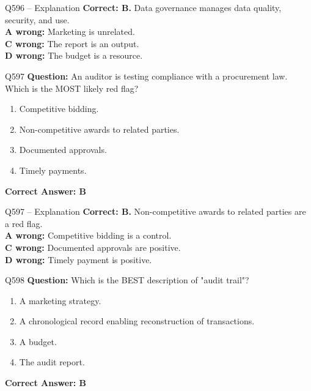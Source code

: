 \documentclass[aspectratio=169,10pt]{beamer}
\begin{document}
	\begin{frame}[t]{Q596 -- Explanation}
		\small
		\textbf{Correct: B.} Data governance manages data quality, security, and use. \\[4pt]
		\textbf{A wrong:} Marketing is unrelated. \\[2pt]
		\textbf{C wrong:} The report is an output. \\[2pt]
		\textbf{D wrong:} The budget is a resource.
	\end{frame}
	
	\begin{frame}[t]{Q597}
		\small
		\textbf{Question:} An auditor is testing compliance with a procurement law. Which is the MOST likely red flag?
		\begin{enumerate}[label=\Alph*.,itemsep=1pt,topsep=2pt]
			\item Competitive bidding.
			\item Non-competitive awards to related parties.
			\item Documented approvals.
			\item Timely payments.
		\end{enumerate}
		\vspace{4pt}
		\textbf{Correct Answer: B}
	\end{frame}
	
	\begin{frame}[t]{Q597 -- Explanation}
		\small
		\textbf{Correct: B.} Non-competitive awards to related parties are a red flag. \\[4pt]
		\textbf{A wrong:} Competitive bidding is a control. \\[2pt]
		\textbf{C wrong:} Documented approvals are positive. \\[2pt]
		\textbf{D wrong:} Timely payment is positive.
	\end{frame}
	
	\begin{frame}[t]{Q598}
		\small
		\textbf{Question:} Which is the BEST description of "audit trail"?
		\begin{enumerate}[label=\Alph*.,itemsep=1pt,topsep=2pt]
			\item A marketing strategy.
			\item A chronological record enabling reconstruction of transactions.
			\item A budget.
			\item The audit report.
		\end{enumerate}
		\vspace{4pt}
		\textbf{Correct Answer: B}
	\end{frame}
	
\end{document}
